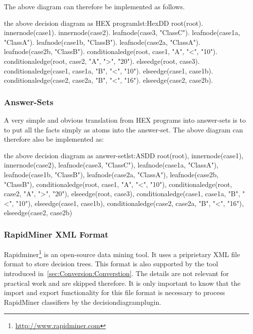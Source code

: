 \documentclass[a4paper,11pt]{article}
\theoremstyle{definition}
\newcommand{\hex}{\textsf{HEX}\xspace }
\newcommand{\inlinecode}[1]{\textsf{#1}\xspace }
\begin{document}
				The above diagram can therefore be implemented as follows.
				
				\begin{program}[dlvhex]{the above decision diagram as \hex program}{lst:HexDD}
root(root).
innernode(case1).
innernode(case2).
leafnode(case3, "ClassC").
leafnode(case1a, "ClassA").
leafnode(case1b, "ClassB").
leafnode(case2a, "ClassA").
leafnode(case2b, "ClassB").
conditionaledge(root, case1, "A", "<", "10").
conditionaledge(root, case2, "A", ">", "20").
elseedge(root, case3).
conditionaledge(case1, case1a, "B", "<", "10").
elseedge(case1, case1b).
conditionaledge(case2, case2a, "B", "<", "16").
elseedge(case2, case2b).
				\end{program}
				
				
			\subsubsection{Answer-Sets}

				A very simple and obvious translation from \hex programs into answer-sets is to to put all the facts simply as atoms into the answer-set. The above diagram can therefore
				also be implemented as:
			
				\begin{program}[dlvhex]{the above decision diagram as answer-set}{lst:ASDD}
{root(root),
innernode(case1),
innernode(case2),
leafnode(case3, "ClassC"),
leafnode(case1a, "ClassA"),
leafnode(case1b, "ClassB"),
leafnode(case2a, "ClassA"),
leafnode(case2b, "ClassB"),
conditionaledge(root, case1, "A", "<", "10"),
conditionaledge(root, case2, "A", ">", "20"),
elseedge(root, case3),
conditionaledge(case1, case1a, "B", "<", "10"),
elseedge(case1, case1b),
conditionaledge(case2, case2a, "B", "<", "16"),
elseedge(case2, case2b)}
				\end{program}

				
			\subsubsection{RapidMiner XML Format}
			
				Rapidminer\footnote{\url{http://www.rapidminer.com}} is an open-source data mining tool. It uses a priprietary XML file format to store decision trees. This format is also
				supported by the tool introduced in~\ref{sec:Conversion:Converstion}. The details are not relevant for practical work and are skipped therefore. It is only important
				to know that the import and export functionality for this file format is necessary to process RapidMiner classifiers by the \inlinecode{decisiondiagramplugin}.
\end{document}
